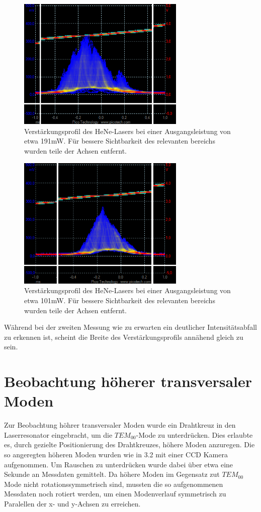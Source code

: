 \documentclass[bigchapter,colorback,accentcolor=tud4b,linedtoc,11pt]{tudreport}
\numberwithin{equation}{subsection}
\begin{document}
\begin{figure}[ht!]
\centering
\includegraphics[width=80mm]{Messdaten/81cm191mW4uW.png}
\caption{Verstärkungsprofil des HeNe-Lasers bei einer Ausgangsleistung von etwa 191mW. Für bessere Sichtbarkeit des relevanten bereichs wurden teile der Achsen entfernt.}
\label{HeNeBreite191mW}
\end{figure}
\begin{figure}[ht!]
\centering
\includegraphics[width=80mm]{Messdaten/81cm101mW4uW.png}
\caption{Verstärkungsprofil des HeNe-Lasers bei einer Ausgangsleistung von etwa 101mW. Für bessere Sichtbarkeit des relevanten bereichs wurden teile der Achsen entfernt.}
\label{HeNeBreite101mW}
\end{figure}
\FloatBarrier
Während bei der zweiten Messung wie zu erwarten ein deutlicher Intensitätsabfall zu erkennen ist, scheint die Breite des Verstärkungsprofils annähend gleich zu sein.
\section{Beobachtung höherer transversaler Moden}
Zur Beobachtung höhrer transversaler Moden wurde ein Drahtkreuz in den Laserresonator eingebracht, um die $TEM_{00}$-Mode zu unterdrücken. Dies erlaubte es, durch gezielte Positionierung des Drahtkreuzes, höhere Moden anzuregen. Die so angeregten höheren Moden wurden wie in 3.2 mit einer CCD Kamera aufgenommen. Um Rauschen zu unterdrücken wurde dabei über etwa eine Sekunde an Messdaten gemittelt. Da höhere Moden im Gegensatz zut $TEM_{00}$ Mode nicht rotationssymmetrisch sind, mussten die so aufgenommenen Messdaten noch rotiert werden, um einen Modenverlauf symmetrisch zu Paralellen der x- und y-Achsen zu erreichen.
\end{document}
